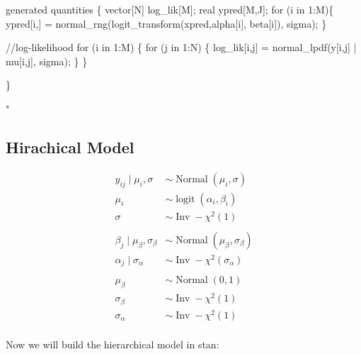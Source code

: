 \documentclass[
]{article}
\newenvironment{Shaded}{\begin{snugshade}}{\end{snugshade}}
\newcommand{\StringTok}[1]{\textcolor[rgb]{0.31,0.60,0.02}{#1}}
\begin{document}
\begin{Shaded}
\begin{Highlighting}[]
\StringTok{generated quantities \{}
\StringTok{  vector[N] log\_lik[M];}
\StringTok{  real ypred[M,J];}
\StringTok{  for (i in 1:M)\{}
\StringTok{    ypred[i,] = normal\_rng(logit\_transform(xpred,alpha[i], beta[i]), sigma);}
\StringTok{  \}}

\StringTok{  //log{-}likelihood}
\StringTok{  for (i in 1:M) \{}
\StringTok{    for (j in 1:N) \{}
\StringTok{    log\_lik[i,j] = normal\_lpdf(y[i,j] | mu[i,j], sigma);}
\StringTok{    \}}
\StringTok{  \}}

\StringTok{\}}

\StringTok{"}
\end{Highlighting}
\end{Shaded}

\hypertarget{hirachical-model}{%
\subsection{Hirachical Model}\label{hirachical-model}}

\[
\begin{aligned}
y_{i j} \mid \mu_i, \sigma &\sim \operatorname{Normal}\left(\mu_i, \sigma\right) \\
\mu_i &\sim \operatorname{logit}(\alpha_i, \beta_i)\\
\sigma & \sim \operatorname{Inv}-\chi^{2}(1) \\
\\
\beta_{j}\mid \mu_{\beta}, \sigma_{\beta} &\sim \operatorname{Normal}(\mu_{\beta}, \sigma_{\beta})\\
\alpha_{j} \mid \sigma_{\alpha} & \sim \operatorname{Inv}-\chi^{2}\left(\sigma_{\alpha}\right) \\
\\
\mu_{\beta} & \sim \operatorname{Normal}(0,1)\\
\sigma_{\beta} & \sim \operatorname{Inv}-\chi^{2}(1) \\
\sigma_{\alpha} & \sim \operatorname{Inv}-\chi^{2}(1) \\
\end{aligned}
\]

Now we will build the hierarchical model in stan:
\end{document}
